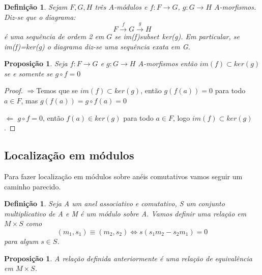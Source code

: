 \documentclass[10pt,a4paper]{article}
\newtheorem{proposition}[theorem]{Proposição}
\newtheorem{definition}[theorem]{Definição}
\begin{document}
\begin{definition}
	Sejam $F, G, H$ três $A$-módulos e $f:F\rightarrow G$, $g:G\rightarrow H$ $A$-morfismos. Diz-se que o diagrama:
	$$F \xrightarrow{f} G \xrightarrow{g}
	H$$
	é uma sequência de ordem 2 em $G$ se im(f)$subset$ ker(g).
	Em particular, se im(f)=ker(g) o diagrama diz-se uma sequência exata em G.
\end{definition}

\begin{proposition}
	Seja $f:F \rightarrow G$ e $g:G \rightarrow H$ $A$-morfismos então
	$im(f)\subset ker(g)$ se e somente se $g \circ f =0$
\end{proposition}
\begin{proof}
	$\Rightarrow$Temos que se	
	$im(f)\subset ker(g)$, então $g(f(a))=0$ para todo $a \in F$, mas $g(f(a))=g \circ f(a)=0$
	
	$\Leftarrow$ $g \circ f =0$, então $f(a) \in ker(g)$ para todo $a \in F$, logo $im(f) \subset ker(g)$.
\end{proof}


\subsection{Localização em módulos}

Para fazer localização em módulos sobre anéis comutativos vamos seguir um caminho parecido.

\begin{definition}
	Seja A um anel associativo e comutativo, S um conjunto multiplicativo de A e M é um módulo sobre A. Vamos definir uma relação em $M \times S$ como $$(m_1,s_1) \equiv (m_2, s_2) \Leftrightarrow s(s_1m_2-s_2m_1)=0$$ para algum  $s \in S$.
\end{definition}

\begin{proposition}
	A relação definida anteriormente é uma relação de equivalência em $M \times S$.
\end{proposition}
\end{document}
